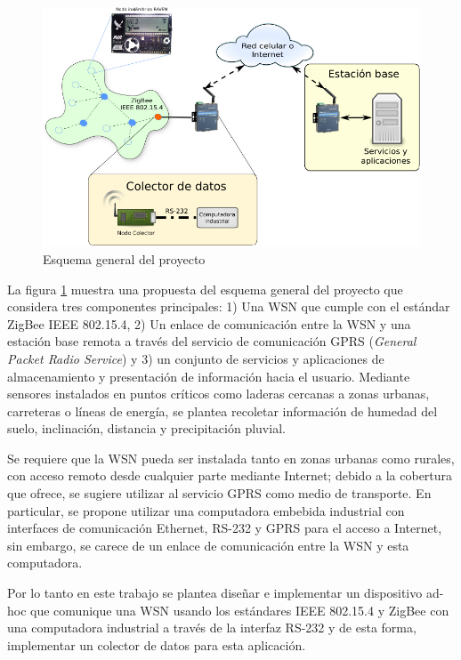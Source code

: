 \begin{figure}
	\centering
	\includegraphics[scale=0.9]{capitulo_1_imgs/esquema_general.pdf} 
	\caption{Esquema general del proyecto}
	\label{fig:esquema_general}
\end{figure}

La figura \ref{fig:esquema_general} muestra una propuesta del esquema general del proyecto que considera tres componentes principales: 1) Una WSN que cumple con el estándar ZigBee IEEE 802.15.4\cite{zigbee:estandar}, 2) Un enlace de comunicación entre la WSN y una estación base remota a través del servicio de comunicación GPRS (\textit{General Packet Radio Service}) y 3) un conjunto de servicios y aplicaciones de almacenamiento y presentación de información hacia el usuario. Mediante sensores instalados en puntos críticos como laderas cercanas a zonas urbanas, carreteras o líneas de energía, se plantea recoletar información de humedad del suelo, inclinación, distancia y precipitación pluvial. 

Se requiere que la WSN pueda ser instalada tanto en zonas urbanas como rurales, con acceso remoto desde cualquier parte mediante Internet; debido a la cobertura que ofrece, se sugiere utilizar al servicio GPRS como medio de transporte. En particular, se propone utilizar una computadora embebida industrial con interfaces de comunicación Ethernet, RS-232 y GPRS para el acceso a Internet, sin embargo, se carece de un enlace de comunicación entre la WSN y esta computadora.

Por lo tanto en este trabajo se plantea diseñar e implementar un dispositivo ad-hoc que comunique una WSN usando los estándares IEEE 802.15.4 y ZigBee con una computadora industrial a través de la interfaz RS-232 y de esta forma, implementar un colector  de datos para esta aplicación. 

